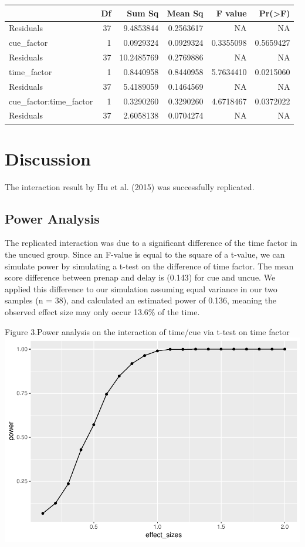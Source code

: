 \documentclass[man,floatsintext]{apa6}
\begin{document}
\begin{tabular}{l|r|r|r|r|r}
\hline
  & Df & Sum Sq & Mean Sq & F value & Pr(>F)\\
\hline
Residuals & 37 & 9.4853844 & 0.2563617 & NA & NA\\
\hline
cue\_factor & 1 & 0.0929324 & 0.0929324 & 0.3355098 & 0.5659427\\
\hline
Residuals & 37 & 10.2485769 & 0.2769886 & NA & NA\\
\hline
time\_factor & 1 & 0.8440958 & 0.8440958 & 5.7634410 & 0.0215060\\
\hline
Residuals & 37 & 5.4189059 & 0.1464569 & NA & NA\\
\hline
cue\_factor:time\_factor & 1 & 0.3290260 & 0.3290260 & 4.6718467 & 0.0372022\\
\hline
Residuals & 37 & 2.6058138 & 0.0704274 & NA & NA\\
\hline
\end{tabular}

\section{Discussion}\label{discussion}

The interaction result by Hu et al. (2015) was successfully replicated.

\subsection{Power Analysis}\label{power-analysis}

The replicated interaction was due to a significant difference of the
time factor in the uncued group. Since an F-value is equal to the square
of a t-value, we can simulate power by simulating a t-test on the
difference of time factor. The mean score difference between prenap and
delay is (0.143) for cue and uncue. We applied this difference to our
simulation assuming equal variance in our two samples (n = 38), and
calculated an estimated power of 0.136, meaning the observed effect size
may only occur 13.6\% of the time.

Figure 3.Power analysis on the interaction of time/cue via t-test on
time factor
\includegraphics{first_apa_files/figure-latex/unnamed-chunk-3-1.pdf}
\end{document}
